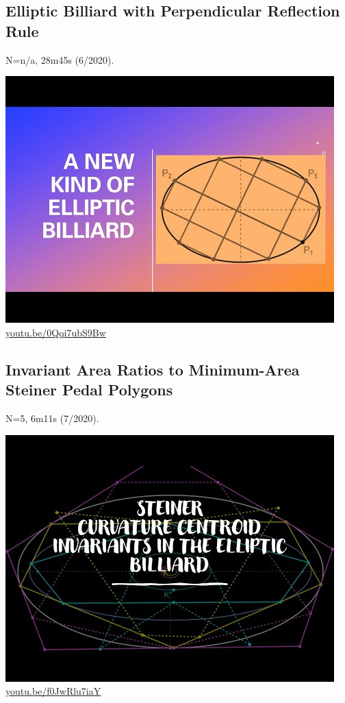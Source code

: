 \documentclass[12pt]{amsart}
\begin{document}
\subsection{Elliptic Billiard with Perpendicular Reflection Rule}
\label{vid:0Qqi7ubS9Bw}
\noindent N=n/a, 28m45s (6/2020). 
\begin{center}\includegraphics[width=.5\textwidth]{pics/0Qqi7ubS9Bw.jpg} \\ 
\href{https://youtu.be/0Qqi7ubS9Bw}{\url{youtu.be/0Qqi7ubS9Bw}}\end{center}
% 

\subsection{Invariant Area Ratios to Minimum-Area Steiner Pedal Polygons}
\label{vid:f0JwRlu7iaY}
\noindent N=5, 6m11s (7/2020). 
\begin{center}\includegraphics[width=.5\textwidth]{pics/f0JwRlu7iaY.jpg} \\ 
\href{https://youtu.be/f0JwRlu7iaY}{\url{youtu.be/f0JwRlu7iaY}}\end{center}
% 
\end{document}
